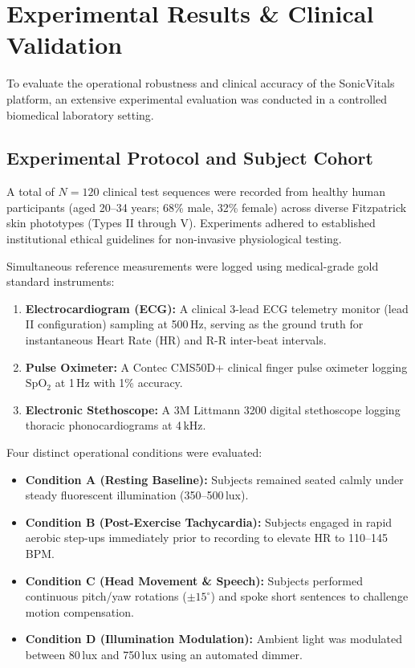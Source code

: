 \documentclass[journal]{IEEEtran}
\begin{document}
\section{Experimental Results \& Clinical Validation}

To evaluate the operational robustness and clinical accuracy of the SonicVitals platform, an extensive experimental evaluation was conducted in a controlled biomedical laboratory setting.

\subsection{Experimental Protocol and Subject Cohort}

A total of $N=120$ clinical test sequences were recorded from healthy human participants (aged 20--34 years; 68\% male, 32\% female) across diverse Fitzpatrick skin phototypes (Types II through V). Experiments adhered to established institutional ethical guidelines for non-invasive physiological testing.

Simultaneous reference measurements were logged using medical-grade gold standard instruments:
\begin{enumerate}
    \item \textbf{Electrocardiogram (ECG):} A clinical 3-lead ECG telemetry monitor (lead II configuration) sampling at 500\,Hz, serving as the ground truth for instantaneous Heart Rate (HR) and R-R inter-beat intervals.
    \item \textbf{Pulse Oximeter:} A Contec CMS50D+ clinical finger pulse oximeter logging $\mathrm{SpO_2}$ at 1\,Hz with 1\% accuracy.
    \item \textbf{Electronic Stethoscope:} A 3M Littmann 3200 digital stethoscope logging thoracic phonocardiograms at 4\,kHz.
\end{enumerate}

Four distinct operational conditions were evaluated:
\begin{itemize}
    \item \textbf{Condition A (Resting Baseline):} Subjects remained seated calmly under steady fluorescent illumination (350--500\,lux).
    \item \textbf{Condition B (Post-Exercise Tachycardia):} Subjects engaged in rapid aerobic step-ups immediately prior to recording to elevate HR to 110--145\,BPM.
    \item \textbf{Condition C (Head Movement \& Speech):} Subjects performed continuous pitch/yaw rotations ($\pm 15^\circ$) and spoke short sentences to challenge motion compensation.
    \item \textbf{Condition D (Illumination Modulation):} Ambient light was modulated between 80\,lux and 750\,lux using an automated dimmer.
\end{itemize}
\end{document}
